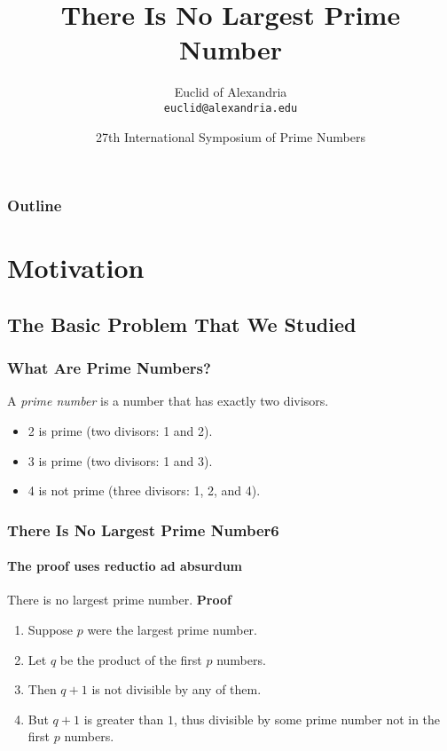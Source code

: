\documentclass{beamer}
\title{There Is No Largest Prime Number}
\author[Euclid]{Euclid of Alexandria \\ \texttt{euclid@alexandria.edu}}
\date[ISPN �80]{27th International Symposium of Prime Numbers}
\begin{document}
\begin{frame}
\titlepage
\end{frame}


\contentpagetrue
\begin{frame}
\frametitle{Outline}
\tableofcontents
\end{frame}

\section{Motivation}
\subsection{The Basic Problem That We Studied}
\contentpagefalse
\frame{\sectionpage}

\contentpagetrue
\begin{frame}
\frametitle{What Are Prime Numbers?}
\begin{definition}
A \emph{prime number} is a number that has exactly two divisors.
\end{definition}
\begin{example}
\begin{itemize}
\item 2 is prime (two divisors: 1 and 2).
\item 3 is prime (two divisors: 1 and 3).
\item 4 is not prime (\alert{three} divisors: 1, 2, and 4).
\end{itemize}
\end{example}
\end{frame}

\begin{frame}[fragile]
\frametitle{There Is No Largest Prime Number6}%
\framesubtitle{The proof uses reductio ad absurdum}%
\begin{theorem}
	There is no largest prime number.
	\tcblower
	\textbf{Proof}
	\begin{enumerate}
		\item<1-> Suppose $p$ were the largest prime number.
		\item<2-> Let $q$ be the product of the first $p$ numbers.
		\item<3-> Then $q + 1$ is not divisible by any of them.
		\item<4-> But $q + 1$ is greater than $1$, thus divisible by some prime number not in the first $p$ numbers.\qedhere
	\end{enumerate}   
\end{theorem}
\end{frame}
\end{document}
